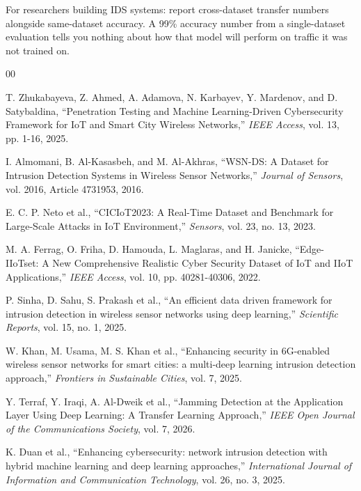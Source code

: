 \documentclass[conference]{IEEEtran}
\begin{document}
For researchers building IDS systems: report cross-dataset transfer numbers alongside same-dataset accuracy. A 99\% accuracy number from a single-dataset evaluation tells you nothing about how that model will perform on traffic it was not trained on.

\begin{thebibliography}{00}

 T. Zhukabayeva, Z. Ahmed, A. Adamova, N. Karbayev, Y. Mardenov, and D. Satybaldina, ``Penetration Testing and Machine Learning-Driven Cybersecurity Framework for IoT and Smart City Wireless Networks,'' \textit{IEEE Access}, vol. 13, pp. 1-16, 2025.

 I. Almomani, B. Al-Kasasbeh, and M. Al-Akhras, ``WSN-DS: A Dataset for Intrusion Detection Systems in Wireless Sensor Networks,'' \textit{Journal of Sensors}, vol. 2016, Article 4731953, 2016.

 E. C. P. Neto et al., ``CICIoT2023: A Real-Time Dataset and Benchmark for Large-Scale Attacks in IoT Environment,'' \textit{Sensors}, vol. 23, no. 13, 2023.

 M. A. Ferrag, O. Friha, D. Hamouda, L. Maglaras, and H. Janicke, ``Edge-IIoTset: A New Comprehensive Realistic Cyber Security Dataset of IoT and IIoT Applications,'' \textit{IEEE Access}, vol. 10, pp. 40281-40306, 2022.

 P. Sinha, D. Sahu, S. Prakash et al., ``An efficient data driven framework for intrusion detection in wireless sensor networks using deep learning,'' \textit{Scientific Reports}, vol. 15, no. 1, 2025.

 W. Khan, M. Usama, M. S. Khan et al., ``Enhancing security in 6G-enabled wireless sensor networks for smart cities: a multi-deep learning intrusion detection approach,'' \textit{Frontiers in Sustainable Cities}, vol. 7, 2025.

 Y. Terraf, Y. Iraqi, A. Al-Dweik et al., ``Jamming Detection at the Application Layer Using Deep Learning: A Transfer Learning Approach,'' \textit{IEEE Open Journal of the Communications Society}, vol. 7, 2026.

 K. Duan et al., ``Enhancing cybersecurity: network intrusion detection with hybrid machine learning and deep learning approaches,'' \textit{International Journal of Information and Communication Technology}, vol. 26, no. 3, 2025.


\end{thebibliography}
\end{document}

